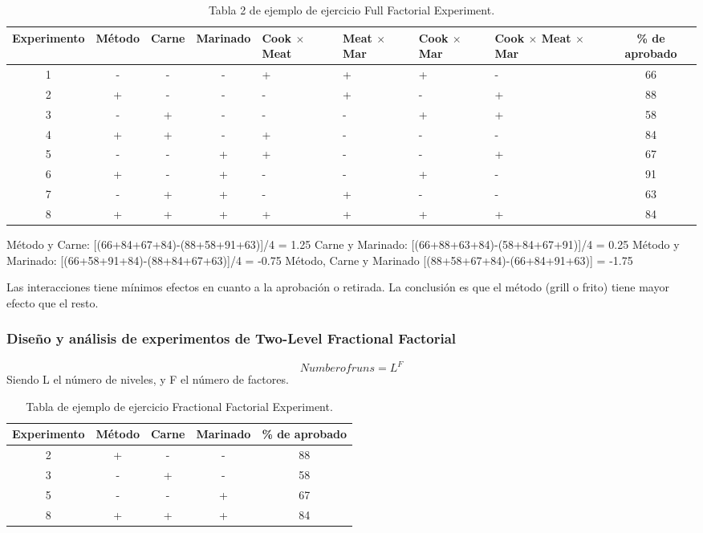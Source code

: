 \documentclass[]{article}
\begin{document}
\begin{table}[H]
	\begin{center}
		\begin{tabular}{|c|c|c|c|p{1.5cm}|p{1.5cm}|p{1.5cm}|p{1.8cm}|c|}
			\hline Experimento & Método & Carne & Marinado & Cook $\times$ Meat & Meat $\times$ Mar & Cook $\times$ Mar & Cook $\times$ Meat $\times$ Mar & \% de aprobado \\ 
			\hline 1 & - & - & - & + & + & + & - & 66 \\ 
			\hline 2 & + & - & - & - & + & - & + & 88 \\ 
			\hline 3 & - & + & - & - & - & + & + & 58 \\ 
			\hline 4 & + & + & - & + & - & - & - & 84 \\ 
			\hline 5 & - & - & + & + & - & - & + & 67 \\ 
			\hline 6 & + & - & + & - & - & + & - & 91 \\ 
			\hline 7 & - & + & + & - & + & - & - & 63 \\ 
			\hline 8 & + & + & + & + & + & + & + & 84 \\ 
			\hline 
		\end{tabular} 
		\caption{Tabla 2 de ejemplo de ejercicio Full Factorial Experiment.}
	\end{center}
\end{table}

Método y Carne: [(66+84+67+84)-(88+58+91+63)]/4 = 1.25
Carne y Marinado: [(66+88+63+84)-(58+84+67+91)]/4 = 0.25
Método y Marinado: [(66+58+91+84)-(88+84+67+63)]/4 = -0.75
Método, Carne y Marinado [(88+58+67+84)-(66+84+91+63)] = -1.75

Las interacciones tiene mínimos efectos en cuanto a la aprobación o retirada. La conclusión es que el método (grill o frito) tiene mayor efecto que el resto.

\subsubsection{Diseño y análisis de experimentos de Two-Level Fractional Factorial}
\begin{equation}
Number of runs = L^F
\end{equation}
Siendo L el número de niveles, y F el número de factores.

\begin{table}[H]
	\begin{center}
		\begin{tabular}{|c|c|c|c|c|}
			\hline Experimento & Método & Carne & Marinado & \% de aprobado \\ 
			\hline 2 & + & - & - & 88 \\ 
			\hline 3 & - & + & - & 58 \\ 
			\hline 5 & - & - & + & 67 \\ 
			\hline 8 & + & + & + & 84 \\ 
			\hline 
		\end{tabular} 
		\caption{Tabla de ejemplo de ejercicio Fractional Factorial Experiment.}
	\end{center}
\end{table}
\end{document}
